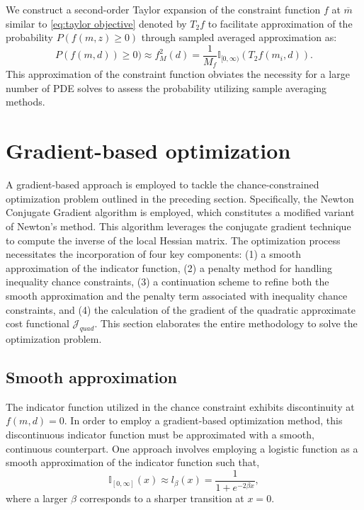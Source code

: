 \documentclass[pdf-a,balance,colorlinks,upint,subscriptcorrection,varvw,mathalfa=cal=boondoxo, spanish,french,vietnamese,russian,greek]{asmeconf}
\begin{document}
We construct a second-order Taylor expansion of the constraint function $f$ at $\overline{m}$ similar to \eqref{eq:taylor objective} denoted by $T_{2}f$ to facilitate approximation of the probability $P(f(m,z)\geq 0)$ through sampled averaged approximation as:
\begin{equation}\label{eq: taylor constraint}
    P(f(m,d))\geq 0) \approx f_{M}^{2}(d) = \frac{1}{M_{f}} \mathbb{I}_{[0,\infty)}(T_{2}f(m_{i},d)).
\end{equation}
%
This approximation of the constraint function obviates the necessity for a large number of PDE solves to assess the probability utilizing sample averaging methods.




\section{Gradient-based optimization}
\noindent
A gradient-based approach is employed to tackle the chance-constrained optimization problem outlined in the preceding section. Specifically, the Newton Conjugate Gradient algorithm is employed, which constitutes a modified variant of Newton's method. This algorithm leverages the conjugate gradient technique to compute the inverse of the local Hessian matrix.
The optimization process necessitates the incorporation of four key components: (1) a smooth approximation of the indicator function, (2) a penalty method for handling inequality chance constraints, (3) a continuation scheme to refine both the smooth approximation and the penalty term associated with inequality chance constraints, and (4) the calculation of the gradient of the quadratic approximate cost functional $\mathcal{J}_{quad}$.
This section elaborates the entire methodology to solve the optimization problem.

\subsection{Smooth approximation}
\noindent 
The indicator function utilized in the chance constraint exhibits discontinuity at $f(m,d) = 0$. In order to employ a gradient-based optimization method, this discontinuous indicator function must be approximated with a smooth, continuous counterpart. One approach involves employing a logistic function as a smooth approximation of the indicator function such that,
\begin{equation}
    \mathbb{I}_{[0,\infty]}(x) \approx l_{\beta}(x) = \frac{1}{1 + e^{-2 \beta x}},
\end{equation}
where a larger $\beta$ corresponds to a sharper transition at $x=0$.
\end{document}
